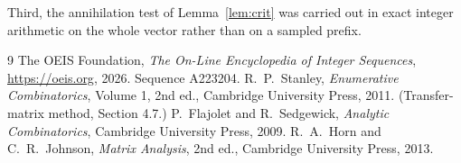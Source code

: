 \documentclass[11pt,a4paper]{article}
\theoremstyle{plain}
\theoremstyle{definition}
\begin{document}
Third, the annihilation test of Lemma~\ref{lem:crit} was carried out in exact integer
arithmetic on the whole vector rather than on a sampled prefix.

\begin{thebibliography}{9}
 The OEIS Foundation, \emph{The On-Line Encyclopedia of Integer
Sequences}, \url{https://oeis.org}, 2026. Sequence A223204.
 R.~P.~Stanley, \emph{Enumerative Combinatorics}, Volume 1, 2nd ed.,
Cambridge University Press, 2011. (Transfer-matrix method, Section 4.7.)
 P.~Flajolet and R.~Sedgewick, \emph{Analytic Combinatorics}, Cambridge
University Press, 2009.
 R.~A.~Horn and C.~R.~Johnson, \emph{Matrix Analysis}, 2nd ed., Cambridge
University Press, 2013.
\end{thebibliography}
\end{document}

